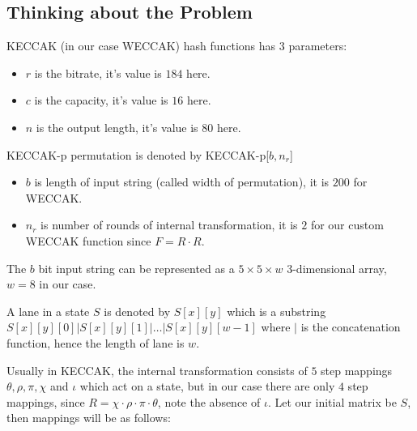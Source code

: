 \documentclass[10pt,twoside]{article}
\begin{document}
\subsection{Thinking about the Problem}

KECCAK (in our case WECCAK) hash functions has 3 parameters:
\begin{itemize}
  \setlength\itemsep{0em}
  \item $r$ is the bitrate, it's value is $184$ here.
  \item $c$ is the capacity, it's value is $16$ here.
  \item $n$ is the output length, it's value is $80$ here.
\end{itemize}

KECCAK-p permutation is denoted by KECCAK-p[$b,n_r$]
\begin{itemize}
  \setlength\itemsep{0em}
  \item $b$ is length of input string (called width of permutation), it is $200$ for WECCAK.
  \item $n_r$ is number of rounds of internal transformation, it is $2$ for our custom WECCAK function since $F=R\cdot R$.
\end{itemize}

The $b$ bit input string can be represented as a $5\times5\times w$ 3-dimensional array, $w=8$ in our case.

A lane in a state $S$ is denoted by $S[x][y]$ which is a substring $S[x][y][0]|S[x][y][1]|\dots|S[x][y][w-1]$ where $|$ is the concatenation function, hence the length of lane is $w$. \newline

Usually in KECCAK, the internal transformation consists of $5$ step mappings $\theta,\rho,\pi,\chi$ and $\iota$ which act on a state, but in our case there are only $4$ step mappings, since $R=\chi\cdot\rho\cdot\pi\cdot\theta$, note the absence of $\iota$. Let our initial matrix be $S$, then mappings will be as follows:
\end{document}

